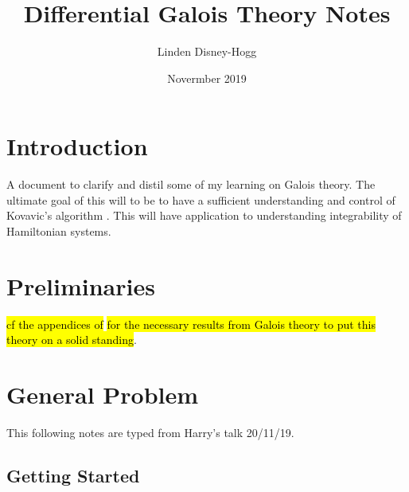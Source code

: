 \documentclass{article}
\title{Differential Galois Theory Notes}
\author{Linden Disney-Hogg}
\date{Novermber 2019}
\begin{document}
\maketitle
\tableofcontents

\section{Introduction}
A document to clarify and distil some of my learning on Galois theory. The ultimate goal of this will to be to have a sufficient understanding and control of Kovavic's algorithm \cite{Kovacic1986AnEquations}. This will have application to understanding integrability of Hamiltonian systems. 
\section{Preliminaries}
\hl{cf the appendices of} \cite{vanderPut2003GaloisEquations} \hl{for the necessary results from Galois theory to put this theory on a solid standing}. 
\section{General Problem}
This following notes are typed from Harry's talk 20/11/19. 
\subsection{Getting Started}
\end{document}
